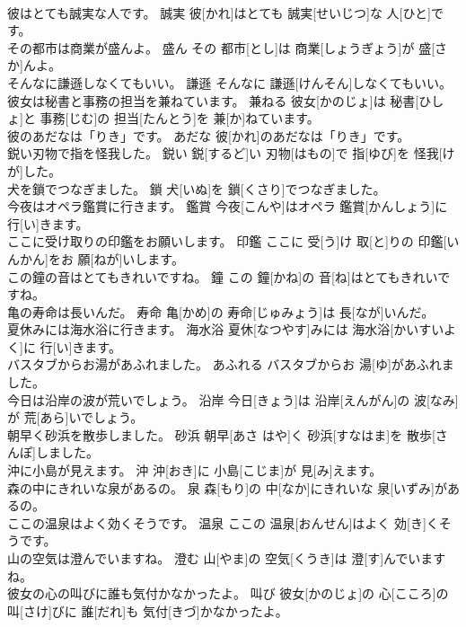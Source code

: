 \documentclass[8pt]{extreport}
\begin{document}
\begin{CJK}{UTF8}{min}
\\	彼はとても誠実な人です。	誠実	彼[かれ]はとても 誠実[せいじつ]な 人[ひと]です。	
\\	その都市は商業が盛んよ。	盛ん	その 都市[とし]は 商業[しょうぎょう]が 盛[さか]んよ。	
\\	そんなに謙遜しなくてもいい。	謙遜	そんなに 謙遜[けんそん]しなくてもいい。	
\\	彼女は秘書と事務の担当を兼ねています。	兼ねる	彼女[かのじょ]は 秘書[ひしょ]と 事務[じむ]の 担当[たんとう]を 兼[か]ねています。	
\\	彼のあだなは「りき」です。	あだな	彼[かれ]のあだなは「りき」です。	
\\	鋭い刃物で指を怪我した。	鋭い	鋭[するど]い 刃物[はもの]で 指[ゆび]を 怪我[けが]した。	
\\	犬を鎖でつなぎました。	鎖	犬[いぬ]を 鎖[くさり]でつなぎました。	
\\	今夜はオペラ鑑賞に行きます。	鑑賞	今夜[こんや]はオペラ 鑑賞[かんしょう]に 行[い]きます。	
\\	ここに受け取りの印鑑をお願いします。	印鑑	ここに 受[う]け 取[と]りの 印鑑[いんかん]をお 願[ねが]いします。	
\\	この鐘の音はとてもきれいですね。	鐘	この 鐘[かね]の 音[ね]はとてもきれいですね。	
\\	亀の寿命は長いんだ。	寿命	亀[かめ]の 寿命[じゅみょう]は 長[なが]いんだ。	
\\	夏休みには海水浴に行きます。	海水浴	夏休[なつやす]みには 海水浴[かいすいよく]に 行[い]きます。	
\\	バスタブからお湯があふれました。	あふれる	バスタブからお 湯[ゆ]があふれました。	
\\	今日は沿岸の波が荒いでしょう。	沿岸	今日[きょう]は 沿岸[えんがん]の 波[なみ]が 荒[あら]いでしょう。	
\\	朝早く砂浜を散歩しました。	砂浜	朝早[あさ はや]く 砂浜[すなはま]を 散歩[さんぽ]しました。	
\\	沖に小島が見えます。	沖	沖[おき]に 小島[こじま]が 見[み]えます。	
\\	森の中にきれいな泉があるの。	泉	森[もり]の 中[なか]にきれいな 泉[いずみ]があるの。	
\\	ここの温泉はよく効くそうです。	温泉	ここの 温泉[おんせん]はよく 効[き]くそうです。	
\\	山の空気は澄んでいますね。	澄む	山[やま]の 空気[くうき]は 澄[す]んでいますね。	
\\	彼女の心の叫びに誰も気付かなかったよ。	叫び	彼女[かのじょ]の 心[こころ]の 叫[さけ]びに 誰[だれ]も 気付[きづ]かなかったよ。	

\end{CJK}
\end{document}
